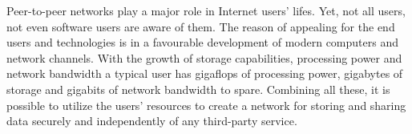 Peer-to-peer networks play a major role in Internet users' lifes.
Yet, not all users, not even \pp software users are aware of them.
The reason of appealing for the end users and \pp technologies
is in a favourable development of modern computers and network channels.
With the growth of storage capabilities, processing power and network
bandwidth a typical user has gigaflops of processing power, gigabytes
of storage and gigabits of network bandwidth to spare. Combining all
these, it is possible to utilize the users' resources to create a
\pp network for storing and sharing data securely and independently
of any third-party service.
